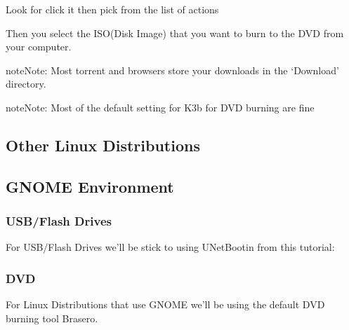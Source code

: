 \documentclass[letterpaper,10pt,english]{sphinxmanual}
\begin{document}
Look for  click it then pick  from the list of actions


Then you select the ISO(Disk Image) that you want to burn to the DVD from your computer.

\begin{sphinxadmonition}{note}{Note:}
Most torrent and browsers store your downloads in the `Download' directory.
\end{sphinxadmonition}

\begin{sphinxadmonition}{note}{Note:}
Most of the default setting for K3b for DVD burning are fine
\end{sphinxadmonition}


\subsection{Other Linux Distributions}
\label{\detokenize{docs/installation:other-linux-distributions}}

\subsection{GNOME Environment}
\label{\detokenize{docs/installation:gnome-environment}}

\subsubsection{USB/Flash Drives}
\label{\detokenize{docs/installation:id3}}
For USB/Flash Drives we'll be stick to using UNetBootin from this tutorial: {\hyperref[\detokenize{docs/installation:usb-drives-link}]{}}


\subsubsection{DVD}
\label{\detokenize{docs/installation:id4}}

For Linux Distributions that use GNOME we'll be using the default DVD burning tool Brasero.
\end{document}

